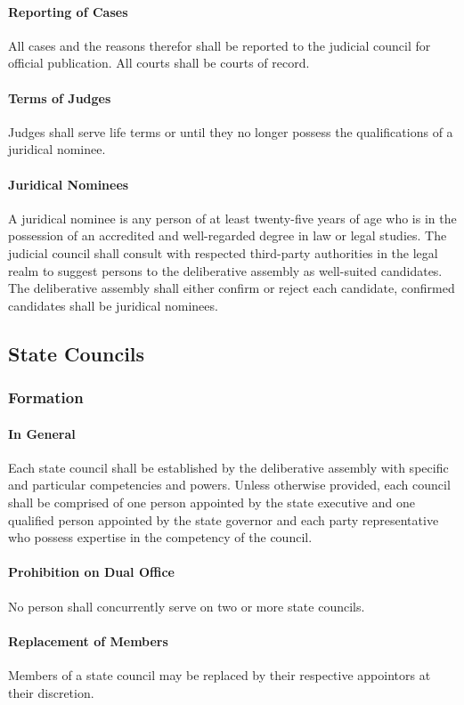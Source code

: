 \documentclass{article}
\begin{document}
\paragraph{Reporting of Cases}
All cases and the reasons therefor shall be reported to the judicial council for official publication. All courts shall be courts of record.
\paragraph{Terms of Judges}
Judges shall serve life terms or until they no longer possess the qualifications of a juridical nominee.
\paragraph{Juridical Nominees}
A juridical nominee is any person of at least twenty-five years of age who is in the possession of an accredited and well-regarded degree in law or legal studies. The judicial council shall consult with respected third-party authorities in the legal realm to suggest persons to the deliberative assembly as well-suited candidates. The deliberative assembly shall either confirm or reject each candidate, confirmed candidates shall be juridical nominees.
\subsection{State Councils}
\subsubsection{Formation}
\paragraph{In General}
Each state council shall be established by the deliberative assembly with specific and particular competencies and powers. Unless otherwise provided, each council shall be comprised of one person appointed by the state executive and one qualified person appointed by the state governor and each party representative who possess expertise in the competency of the council. 
\paragraph{Prohibition on Dual Office}
No person shall concurrently serve on two or more state councils.
\paragraph{Replacement of Members}
Members of a state council may be replaced by their respective appointors at their discretion.
\end{document}
